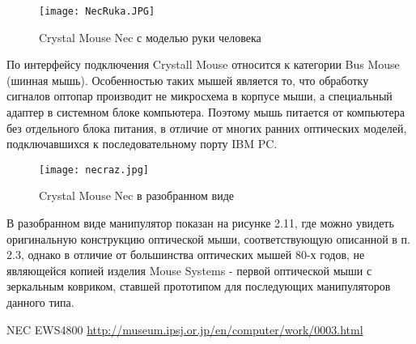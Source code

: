 \documentclass[11pt, a4paper]{article}
\begin{document}
\begin{figure}[h]
    \centering
    \texttt{[image: NecRuka.JPG]}
    \caption{Crystal Mouse Nec с моделью руки человека}
    \label{fig:NecCrystalHand}
\end{figure}
    
    По интерфейсу подключения Crystall Mouse относится к категории 
    Bus Mouse (шинная мышь). Особенностью таких мышей является то, что обработку сигналов оптопар производит не микросхема в корпусе мыши, а специальный адаптер в системном блоке компьютера. 
    Поэтому мышь питается от компьютера без отдельного блока питания, в отличие от многих ранних оптических моделей, подключавшихся к последовательному порту IBM PC. 

\begin{figure}[h]
    \centering
    \texttt{[image: necraz.jpg]}
    \caption{Crystal Mouse Nec в разобранном виде}
    \label{fig:NecCrystalInside}
\end{figure}

    В разобранном виде манипулятор показан на рисунке 2.11, где можно увидеть оригинальную конструкцию оптической мыши, соответствующую описанной в п. 2.3, однако в отличие от большинства оптических мышей 80-х годов, не являющейся копией изделия Mouse Systems - первой оптической мыши с зеркальным ковриком, ставшей прототипом для последующих манипуляторов данного типа.
    
\begin{thebibliography}{9}
 NEC EWS4800 \url{http://museum.ipsj.or.jp/en/computer/work/0003.html}
\end{thebibliography}
\end{document}
